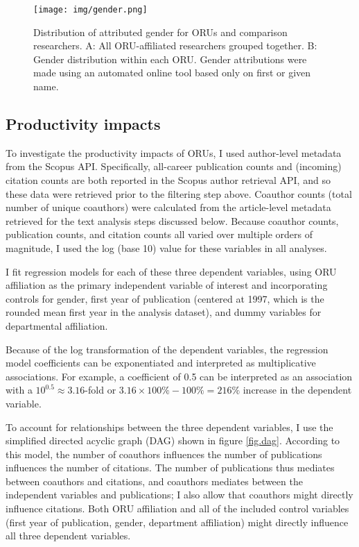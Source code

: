 \documentclass[
  11pt,
]{article}
\begin{document}
\begin{figure}
\centering
\texttt{[image: img/gender.png]}
\caption{Distribution of attributed gender for ORUs and comparison researchers. A: All ORU-affiliated researchers grouped together. B: Gender distribution within each ORU. Gender attributions were made using an automated online tool based only on first or given name. \label{fig.gender}}
\end{figure}

\hypertarget{productivity-impacts-1}{%
\subsection{Productivity impacts}\label{productivity-impacts-1}}

To investigate the productivity impacts of ORUs, I used author-level metadata from the Scopus API. Specifically, all-career publication counts and (incoming) citation counts are both reported in the Scopus author retrieval API, and so these data were retrieved prior to the filtering step above. Coauthor counts (total number of unique coauthors) were calculated from the article-level metadata retrieved for the text analysis steps discussed below. Because coauthor counts, publication counts, and citation counts all varied over multiple orders of magnitude, I used the log (base 10) value for these variables in all analyses.

I fit regression models for each of these three dependent variables, using ORU affiliation as the primary independent variable of interest and incorporating controls for gender, first year of publication (centered at 1997, which is the rounded mean first year in the analysis dataset), and dummy variables for departmental affiliation.

Because of the log transformation of the dependent variables, the regression model coefficients can be exponentiated and interpreted as multiplicative associations. For example, a coefficient of 0.5 can be interpreted as an association with a \(10^{0.5} \approx 3.16\)-fold or \(3.16 \times 100\% - 100\% = 216\%\) increase in the dependent variable.

To account for relationships between the three dependent variables, I use the simplified directed acyclic graph (DAG) shown in figure \ref{fig.dag}. According to this model, the number of coauthors influences the number of publications influences the number of citations. The number of publications thus mediates between coauthors and citations, and coauthors mediates between the independent variables and publications; I also allow that coauthors might directly influence citations. Both ORU affiliation and all of the included control variables (first year of publication, gender, department affiliation) might directly influence all three dependent variables.
\end{document}
